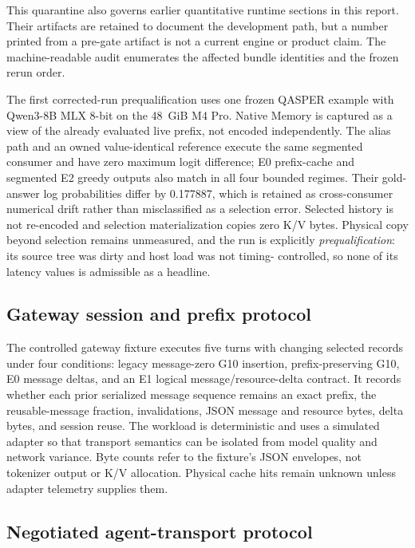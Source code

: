\documentclass[11pt]{article}
\begin{document}
This quarantine also governs earlier quantitative runtime sections in this
report. Their artifacts are retained to document the development path, but a
number printed from a pre-gate artifact is not a current engine or product
claim. The machine-readable audit enumerates the affected bundle identities and
the frozen rerun order.

The first corrected-run prequalification uses one frozen QASPER example with
Qwen3-8B MLX 8-bit on the 48~GiB M4 Pro. Native Memory is captured as a view of
the already evaluated live prefix, not encoded independently. The alias path
and an owned value-identical reference execute the same segmented consumer and
have zero maximum logit difference; E0 prefix-cache and segmented E2 greedy
outputs also match in all four bounded regimes. Their gold-answer log
probabilities differ by 0.177887, which is retained as cross-consumer numerical
drift rather than misclassified as a selection error. Selected history is not
re-encoded and selection materialization copies zero K/V bytes. Physical copy
beyond selection remains unmeasured, and the run is explicitly
\emph{prequalification}: its source tree was dirty and host load was not timing-
controlled, so none of its latency values is admissible as a headline.

\subsection{Gateway session and prefix protocol}

The controlled gateway fixture executes five turns with changing selected
records under four conditions: legacy message-zero G10 insertion,
prefix-preserving G10, E0 message deltas, and an E1 logical
message/resource-delta contract. It records whether each prior serialized
message sequence remains an exact prefix, the reusable-message fraction,
invalidations, JSON message and resource bytes, delta bytes, and session reuse.
The workload is deterministic and uses a simulated adapter so that transport
semantics can be isolated from model quality and network variance. Byte counts
refer to the fixture's JSON envelopes, not tokenizer output or K/V allocation.
Physical cache hits remain unknown unless adapter telemetry supplies them.

\subsection{Negotiated agent-transport protocol}
\end{document}

